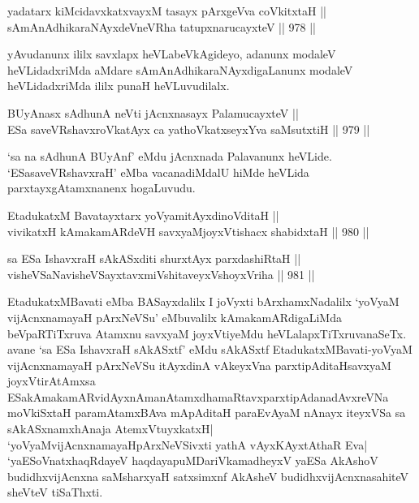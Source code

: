 \begin{shl}
yadatarx kiMcidavxkatxvayxM tasayx pArxgeVva coVkitxtaH || \\
\footnotemark[4]sAmAnAdhikaraNAyxdeVneVRha tatupxnarucayxteV ||  978 ||  
\end{shl}

\begin{artha}
yAvudanunx ililx savxlapx heVLabeVkAgideyo, adanunx modaleV heVLidadxriMda aMdare sAmAnAdhikaraNAyxdigaLanunx modaleV heVLidadxriMda ililx punaH heVLuvudilalx.
\end{artha}


\begin{shl}
BUyAnasx sAdhunA neVti jAcnxnasayx PalamucayxteV || \\
ESa saveVRshavxroVkatAyx ca yathoVkatxseyxYva saMsutxtiH ||  979 ||  
\end{shl}

\begin{artha}
`sa na sAdhunA BUyAnf' eMdu jAcnxnada Palavanunx heVLide. `ESasaveVRshavxraH' eMba vacanadiMdalU hiMde heVLida parxtayxgAtamxnanenx hogaLuvudu.
\end{artha}


\begin{shl}
EtadukatxM Bavatayxtarx yoV\s yamitAyxdinoVditaH || \\
vivikatxH kAmakamARdeVH savxyaMjoyxVtishacx shabidxtaH ||  980 ||  
\end{shl}
				
\begin{shl}
sa ESa IshavxraH sAkASxditi shurxtAyx parxdashiRtaH || \\
visheVSaNavisheVSayxtavxmiVshitaveyxVshoyxVriha ||  981 ||  
\end{shl}

\begin{artha}
EtadukatxMBavati eMba BASayxdalilx I joVyxti bArxhamxNadalilx `yoV\s yaM vijAcnxnamayaH pArxNeVSu' eMbuvalilx kAmakamARdigaLiMda beVpaRTiTxruva Atamxnu savxyaM joyxVtiyeMdu heVLalapxTiTxruvanaSeTx. avane `sa ESa IshavxraH sAkASxtf' eMdu sAkASxtf EtadukatxMBavati-yoV\s yaM vijAcnxnamayaH pArxNeVSu itAyxdinA vAkeyxVna parxtipAditaHsavxyaM joyxVtirAtAmxsa ESakAmakamARvidAyxnAmanAtamxdhamaRtavxparxtipAdanadAvxreVNa moVkiSxtaH paramAtamxBAva mApAditaH paraEvAyaM nAnayx iteyxVSa sa sAkASxnamxhAnaja AtemxVtuyxkatxH| `yoV\s yaMvijAcnxnamayaHpArxNeVSivxti yathA vAyxKAyxtAthaR Eva| `yaESoV\s natxhaqRdayeV haqdayapuMDariVkamadheyxV yaESa AkAshoV budidhxvijAcnxna saMsharxyaH satxsimxnf AkAsheV budidhxvijAcnxnasahiteV sheVteV tiSaThxti.
\end{artha}

